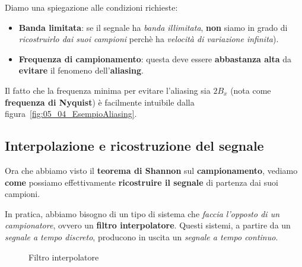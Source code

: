 Diamo una spiegazione alle condizioni richieste:
\begin{itemize}
    \item \textbf{Banda limitata}: se il segnale ha \textit{banda illimitata},
        \textbf{non} siamo in grado di \textit{ricostruirlo dai suoi campioni} perchè 
        ha \textit{velocità di variazione infinita}).
    \item \textbf{Frequenza di campionamento}: questa deve essere \textbf{abbastanza alta}
    da \textbf{evitare} il fenomeno dell'\textbf{aliasing}.
\end{itemize}

Il fatto che la frequenza minima per evitare l'aliasing sia $2B_x$ 
(nota come \textbf{frequenza di Nyquist}) è facilmente intuibile dalla
figura~\ref{fig:05_04_EsempioAliasing}.

\subsection{Interpolazione e ricostruzione del segnale}

Ora che abbiamo visto il \textbf{teorema di Shannon} sul \textbf{campionamento}, vediamo 
\textbf{come} possiamo effettivamente \textbf{ricostruire il segnale} di partenza
dai suoi campioni.

In pratica, abbiamo bisogno di un tipo di sistema che \textit{faccia l'opposto di un campionatore},
ovvero un \textbf{filtro interpolatore}. Questi sistemi, a partire da un \textit{segnale
a tempo discreto}, producono in uscita un \textit{segnale a tempo continuo}.

\begin{figure}[!ht]
    \centering
    \caption{Filtro interpolatore}
    \label{fig:05_05_FiltroInterpolatore}
\end{figure}


